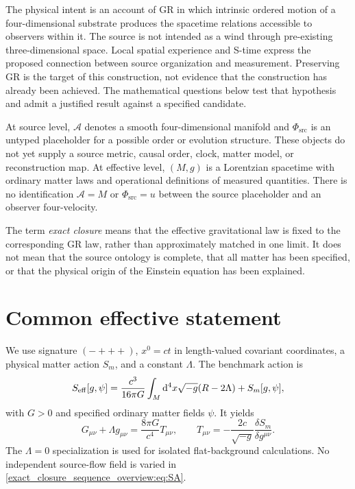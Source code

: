 \documentclass[11pt,oneside]{report}
\newcommand{\Sub}{\mathcal A}
\newcommand{\PhiSrc}{\Phi_{\mathrm{src}}}
\newcommand{\dd}{\mathrm d}
\theoremstyle{remark}
\numberwithin{definition}{chapter}
\numberwithin{proposition}{chapter}
\numberwithin{remark}{chapter}
\begin{document}
The physical intent is an account of GR in which intrinsic ordered motion of a four-dimensional substrate produces the spacetime relations accessible to observers within it. The source is not intended as a wind through pre-existing three-dimensional space. Local spatial experience and S-time express the proposed connection between source organization and measurement. Preserving GR is the target of this construction, not evidence that the construction has already been achieved. The mathematical questions below test that hypothesis and admit a justified result against a specified candidate.

At source level, $\Sub$ denotes a smooth four-dimensional manifold and $\PhiSrc$ is an untyped placeholder for a possible order or evolution structure. These objects do not yet supply a source metric, causal order, clock, matter model, or reconstruction map. At effective level, $(M,g)$ is a Lorentzian spacetime with ordinary matter laws and operational definitions of measured quantities. There is no identification $\Sub=M$ or $\PhiSrc=u$ between the source placeholder and an observer four-velocity.

The term \emph{exact closure} means that the effective gravitational law is fixed to the corresponding GR law, rather than approximately matched in one limit. It does not mean that the source ontology is complete, that all matter has been specified, or that the physical origin of the Einstein equation has been explained.

\section{Common effective statement}
We use signature $(-+++)$, $x^0=ct$ in length-valued covariant coordinates, a physical matter action $S_m$, and a constant $\Lambda$. The benchmark action is
\begin{equation}
S_{\rm eff}[g,\psi]=\frac{c^3}{16\pi G}
\int_M\dd^4x\sqrt{-g}(R-2\Lambda)+S_m[g,\psi],
\label{exact_closure_sequence_overview:eq:SA}
\end{equation}
with $G>0$ and specified ordinary matter fields $\psi$. It yields
\begin{equation}
G_{\mu\nu}+\Lambda g_{\mu\nu}=\frac{8\pi G}{c^4}T_{\mu\nu},
\qquad T_{\mu\nu}=-\frac{2c}{\sqrt{-g}}\frac{\delta S_m}{\delta g^{\mu\nu}}.
\label{exact_closure_sequence_overview:eq:einstein}
\end{equation}
The $\Lambda=0$ specialization is used for isolated flat-background calculations. No independent source-flow field is varied in \eqref{exact_closure_sequence_overview:eq:SA}.
\end{document}

